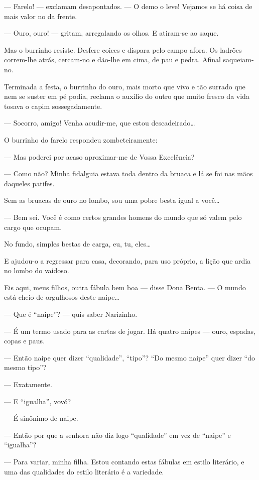 --- Farelo! --- exclamam desapontados. --- O demo o leve! Vejamos se há
coisa de mais valor no da frente.

--- Ouro, ouro! --- gritam, arregalando os olhos. E atiram-se ao saque.

Mas o burrinho resiste. Desfere coices e dispara pelo campo afora. Os
ladrões correm-lhe atrás, cercam-no e dão-lhe em cima, de pau e pedra.
Afinal saqueiam-no.

Terminada a festa, o burrinho do ouro, mais morto que vivo e tão surrado
que nem se suster em pé podia, reclama o auxílio do outro que muito
fresco da vida tosava o capim sossegadamente.

--- Socorro, amigo! Venha acudir-me, que estou descadeirado\ldots{}

O burrinho do farelo respondeu zombeteiramente:

--- Mas poderei por acaso aproximar-me de Vossa Excelência?

--- Como não? Minha fidalguia estava toda dentro da bruaca e lá se foi
nas mãos daqueles patifes.

Sem as bruacas de ouro no lombo, sou uma pobre besta igual a
você\ldots{}

--- Bem sei. Você é como certos grandes homens do mundo que só valem
pelo cargo que ocupam.

No fundo, simples bestas de carga, eu, tu, eles\ldots{}

E ajudou-o a regressar para casa, decorando, para uso próprio, a lição
que ardia no lombo do vaidoso.

Eis aqui, meus filhos, outra fábula bem boa --- disse Dona Benta. --- O
mundo está cheio de orgulhosos deste naipe\ldots{}

--- Que é ``naipe''? --- quis saber Narizinho.

--- É um termo usado para as cartas de jogar. Há quatro naipes --- ouro,
espadas, copas e paus.

--- Então naipe quer dizer ``qualidade'', ``tipo''? ``Do mesmo naipe''
quer dizer ``do mesmo tipo''?

--- Exatamente.

--- E ``igualha'', vovó?

--- É sinônimo de naipe.

--- Então por que a senhora não diz logo ``qualidade'' em vez de
``naipe'' e ``igualha''?

--- Para variar, minha filha. Estou contando estas fábulas em estilo
literário, e uma das qualidades do estilo literário é a variedade.

